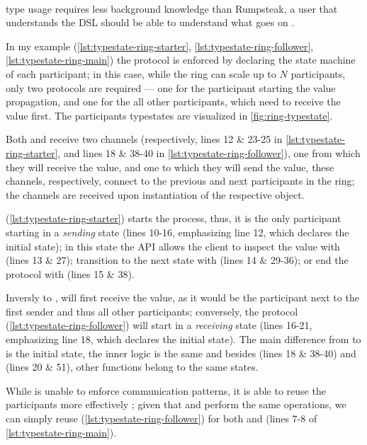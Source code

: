 \paragraph{} type usage requires less background knowledge than Rumpsteak,
a user that understands the \gls{DSL} should be able to understand what goes on .

In my example (\autoref{lst:typestate-ring-starter}, \autoref{lst:typestate-ring-follower},  \autoref{lst:typestate-ring-main})
the protocol is enforced by declaring the state machine of each participant;
in this case, while the ring can scale up to $N$ participants, only two protocols are required ---
one for the participant starting the value propagation,
and one for the all other participants, which need to receive the value first.
The participants typestates are visualized in \autoref{fig:ring-typestate}.

Both  and  receive two channels
(respectively, lines 12 \& 23-25 in \autoref{lst:typestate-ring-starter}, and lines 18 \& 38-40 in \autoref{lst:typestate-ring-follower}),
one from which they will receive the value, and one to which they will send the value,
these channels, respectively, connect to the previous and next participants in the ring;
the channels are received upon instantiation of the respective  object.

 (\autoref{lst:typestate-ring-starter}) starts the process,
thus, it is the only participant starting in a \emph{sending} state
(lines 10-16, emphasizing line 12, which declares the initial state);
in this state the \gls{API} allows the client to inspect the value with  (lines 13 \& 27);
transition to the next state with  (lines 14 \& 29-36);
or end the protocol with  (lines 15 \& 38).

Inversly to ,  will first receive the value,
as it would be the participant next to the first sender and thus all other participants;
conversely, the protocol (\autoref{lst:typestate-ring-follower}) will start in a \emph{receiving} state
(lines 16-21, emphasizing line 18, which declares the initial state).
The main difference from  to  is the initial state, the inner logic is the same
and besides  (lines 18 \& 38-40) and  (lines 20 \& 51), other functions belong to the same states.

While  is unable to enforce communication patterns,
it is able to reuse the participants more effectively ;
given that  and  perform the same operations, we can simply reuse  (\autoref{lst:typestate-ring-follower})
for both  and  (lines 7-8 of \autoref{lst:typestate-ring-main}).

